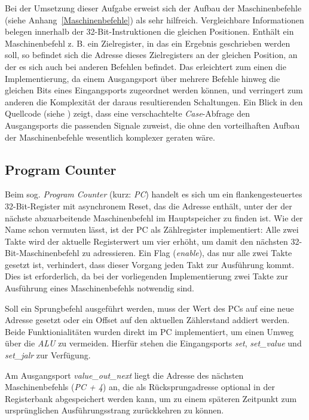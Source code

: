 Bei der Umsetzung dieser Aufgabe erweist sich der Aufbau der Maschinenbefehle (siehe Anhang~\ref{Maschinenbefehle}) als sehr hilfreich.
Vergleichbare Informationen belegen innerhalb der 32-Bit-Instruktionen die gleichen Positionen.
Enthält ein Maschinenbefehl z. B. ein Zielregister, in das ein Ergebnis geschrieben werden soll, so befindet sich die Adresse dieses Zielregisters an der gleichen Position, an der es sich auch bei anderen Befehlen befindet.
Das erleichtert zum einen die Implementierung, da einem Ausgangsport über mehrere Befehle hinweg die gleichen Bits eines Eingangsports zugeordnet werden können, und verringert zum anderen die Komplexität der daraus resultierenden Schaltungen. 
Ein Blick in den Quellcode (siehe ) zeigt, dass eine verschachtelte \textit{Case}-Abfrage den Ausgangsports die passenden Signale zuweist, die ohne den vorteilhaften Aufbau der Maschinenbefehle wesentlich komplexer geraten wäre.

\subsection{Program Counter}
\label{sec:programcounter}
Beim sog. \textit{Program Counter} (kurz: \textit{PC}) handelt es sich um ein flankengesteuertes 32-Bit-Register mit asynchronem Reset, das die Adresse enthält, unter der der nächste abzuarbeitende Maschinenbefehl im Hauptspeicher zu finden ist. 
Wie der Name schon vermuten lässt, ist der PC als Zählregister implementiert:
Alle zwei Takte wird der aktuelle Registerwert um vier erhöht, um damit den nächsten 32-Bit-Maschinenbefehl zu adressieren.
Ein Flag (\textit{enable}), das nur alle zwei Takte gesetzt ist, verhindert, dass dieser Vorgang jeden Takt zur Ausführung kommt. Dies ist erforderlich, da bei der vorliegenden Implementierung zwei Takte zur Ausführung eines Maschinenbefehls notwendig sind.

Soll ein Sprungbefehl ausgeführt werden, muss der Wert des PCs auf eine neue Adresse gesetzt oder ein Offset auf den aktuellen Zählerstand addiert werden.
Beide Funktionialitäten wurden direkt im PC implementiert, um einen Umweg über die \textit{ALU} zu vermeiden.
Hierfür stehen die Eingangsports \textit{set}, \textit{set\_value} und \textit{set\_jalr} zur Verfügung.

Am Ausgangsport \textit{value\_out\_next} liegt die Adresse des nächsten Maschinenbefehls (\textit{PC + 4}) an, die als Rücksprungadresse optional in der Registerbank abgespeichert werden kann, um zu einem späteren Zeitpunkt zum ursprünglichen Ausführungsstrang zurückkehren zu können.

